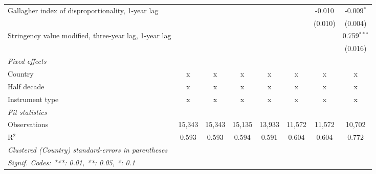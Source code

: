 \begin{table}[htbp]
\begin{tabular}{lccccccc}
      Gallagher index of disproportionality, 1-year lag     &         &         &             &              &               & -0.010        & -0.009$^{*}$\\   
                                                            &         &         &             &              &               & (0.010)       & (0.004)\\   
      Stringency value modified, three-year lag, 1-year lag &         &         &             &              &               &               & 0.759$^{***}$\\   
                                                            &         &         &             &              &               &               & (0.016)\\   
      \emph{Fixed effects}\\
      Country                                               & x       & x       & x           & x            & x             & x             & x\\  
      Half decade                                           & x       & x       & x           & x            & x             & x             & x\\  
      Instrument type                                       & x       & x       & x           & x            & x             & x             & x\\  
      \midrule \emph{Fit statistics}\\
      Observations                                          & 15,343  & 15,343  & 15,135      & 13,933       & 11,572        & 11,572        & 10,702\\  
      R$^2$                                                 & 0.593   & 0.593   & 0.594       & 0.591        & 0.604         & 0.604         & 0.772\\  
      \midrule
      \multicolumn{8}{l}{\emph{Clustered (Country) standard-errors in parentheses}}\\
      \multicolumn{8}{l}{\emph{Signif. Codes: ***: 0.01, **: 0.05, *: 0.1}}\\
   \end{tabular}
\end{table}


